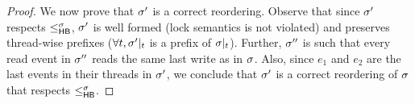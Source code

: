 \begin{proof}
We now prove that $\sigma'$ is a correct reordering. Observe that since
$\sigma'$ respects $\leq^{\sigma}_{\mathsf{HB}}$, $\sigma'$ is well formed (lock semantics is
not violated) and preserves thread-wise prefixes ($\forall
t, \sigma'|_{t}$ is a prefix of $\sigma|_{t}$).  Further, $\sigma''$
is such that every read event in $\sigma''$ reads the same last write as
in $\sigma$.  Also, since $e_1$ and $e_2$ are the last events in their
threads in $\sigma'$, we conclude that $\sigma'$ is a correct reordering of
$\sigma$ that respects $\leq^{\sigma}_{\mathsf{HB}}$.
%
%

\end{proof}
